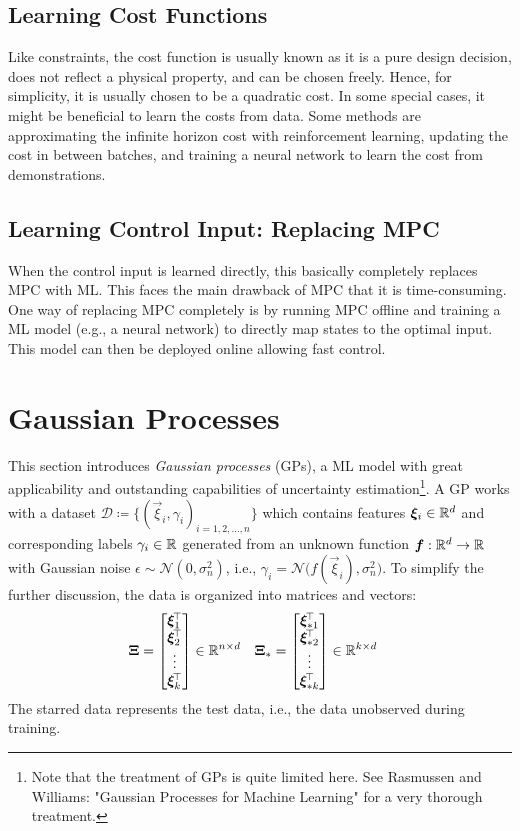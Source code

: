 		\subsection{Learning Cost Functions}
			Like constraints, the cost function is usually known as it is a pure design decision, does not reflect a physical property, and can be chosen freely. Hence, for simplicity, it is usually chosen to be a quadratic cost. In some special cases, it might be beneficial to learn the costs from data. Some methods are approximating the infinite horizon cost with reinforcement learning, updating the cost in between batches, and training a neural network to learn the cost from demonstrations.

		\subsection{Learning Control Input: Replacing MPC}
			When the control input is learned directly, this basically completely replaces MPC with ML. This faces the main drawback of MPC that it is time-consuming. One way of replacing MPC completely is by running MPC offline and training a ML model (e.g., a neural network) to directly map states to the optimal input. This model can then be deployed online allowing fast control.

	\section{Gaussian Processes}
		This section introduces \emph{Gaussian processes} (GPs), a ML model with great applicability and outstanding capabilities of uncertainty estimation\footnote{Note that the treatment of GPs is quite limited here. See Rasmussen and Williams: "Gaussian Processes for Machine Learning" for a very thorough treatment.}. A GP works with a dataset \( \mathcal{D} \coloneqq \{ (\vec{\xi}_i, \gamma_i)_{i = 1, 2, \dots, n} \} \) which contains features \(\bm{\xi}_i \in \mathbb{R}^d\) and corresponding labels \(\gamma_i \in \mathbb{R}\) generated from an unknown function \( \bm{f} : \mathbb{R}^d \to \mathbb{R} \) with Gaussian noise \( \epsilon \sim \mathcal{N}(0, \sigma_n^2) \), i.e., \( \gamma_i = \mathcal{N}\bigl(f(\vec{\xi}_i), \sigma_n^2\bigr) \). To simplify the further discussion, the data is organized into matrices and vectors:
		\begin{align}
			\bm{\mathrm{\Xi}}      & = \begin{bmatrix} \bm{\xi}_1^{\!\top} \\ \bm{\xi}_2^{\!\top} \\ \vdots \\ \bm{\xi}_k^{\!\top} \end{bmatrix} \in \mathbb{R}^{n \times d}                      &
			\bm{\mathrm{\Xi}}_\ast & = \begin{bmatrix} \bm{\xi}_{\ast 1}^{\!\top} \\ \bm{\xi}_{\ast 2}^{\!\top} \\ \vdots \\ \bm{\xi}_{\ast k}^{\!\top} \end{bmatrix} \in \mathbb{R}^{k \times d}
		\end{align}
		The starred data represents the test data, i.e., the data unobserved during training.

